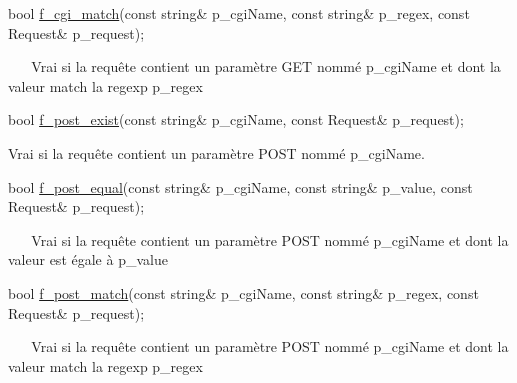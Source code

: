 \begin{DoxyItemize}
\item 
\begin{DoxyCode}
\textcolor{keywordtype}{bool} \hyperlink{classxtd_1_1network_1_1http_1_1Server_ae8122d6287a52f0933af7ab687710768}{f\_cgi\_match}(\textcolor{keyword}{const} \textcolor{keywordtype}{string}& p\_cgiName, \textcolor{keyword}{const} \textcolor{keywordtype}{string}& p\_regex, \textcolor{keyword}{const} Request& p\_request); 
\end{DoxyCode}
 ~\newline
~\newline
 Vrai si la requête contient un paramètre G\+ET nommé p\+\_\+cgi\+Name et dont la valeur match la regexp p\+\_\+regex ~\newline
~\newline

\item 
\begin{DoxyCode}
\textcolor{keywordtype}{bool} \hyperlink{classxtd_1_1network_1_1http_1_1Server_adbd0e1d940294921e1d79b7e747d98fb}{f\_post\_exist}(\textcolor{keyword}{const} \textcolor{keywordtype}{string}& p\_cgiName, \textcolor{keyword}{const} Request& p\_request); 
\end{DoxyCode}
 Vrai si la requête contient un paramètre P\+O\+ST nommé p\+\_\+cgi\+Name. ~\newline
~\newline
 ~\newline
~\newline

\item 
\begin{DoxyCode}
\textcolor{keywordtype}{bool} \hyperlink{classxtd_1_1network_1_1http_1_1Server_a5ffcf38b185fc098c12969df414fe732}{f\_post\_equal}(\textcolor{keyword}{const} \textcolor{keywordtype}{string}& p\_cgiName, \textcolor{keyword}{const} \textcolor{keywordtype}{string}& p\_value, \textcolor{keyword}{const} Request& p\_request); 
\end{DoxyCode}
 ~\newline
~\newline
 Vrai si la requête contient un paramètre P\+O\+ST nommé p\+\_\+cgi\+Name et dont la valeur est égale à p\+\_\+value ~\newline
~\newline

\item 
\begin{DoxyCode}
\textcolor{keywordtype}{bool} \hyperlink{classxtd_1_1network_1_1http_1_1Server_af5dbf38109b8345e6dcc7f29dfdd781a}{f\_post\_match}(\textcolor{keyword}{const} \textcolor{keywordtype}{string}& p\_cgiName, \textcolor{keyword}{const} \textcolor{keywordtype}{string}& p\_regex, \textcolor{keyword}{const} Request& p\_request); 
\end{DoxyCode}
 ~\newline
~\newline
 Vrai si la requête contient un paramètre P\+O\+ST nommé p\+\_\+cgi\+Name et dont la valeur match la regexp p\+\_\+regex ~\newline
~\newline


\end{DoxyItemize}
